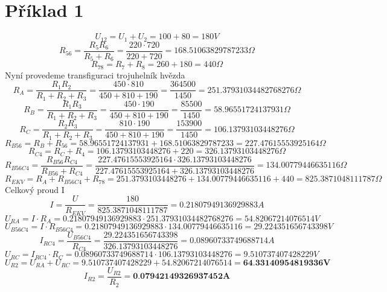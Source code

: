\section{Příklad 1}
\[
  U_{12} = U_{1} + U_{2} = 100 + 80 = 180V
\]
\[
  R_{56} = \displaystyle\frac{R_{5}R_{6}}{R_{5}+R_{6}}  = \displaystyle\frac{220 \cdot 720}{220 + 720} = 168.51063829787233 \Omega
\]
\[
  R_{78} = R_{7} + R_{8} = 260 + 180 = 440\Omega
\]
Nyní provedeme transfiguraci  trojuhelník hvězda
\[
  R_{A} = \displaystyle\frac{R_{1}R_{2}}{R_{1}+R_{2}+R_{3}}
  = \displaystyle\frac{450 \cdot 810}{450 + 810 + 190}
  = \displaystyle\frac{364500}{1450}
  = 251.37931034482768276 \Omega
\]
\[
  R_{B} = \displaystyle\frac{R_{1}R_{3}}{R_{1}+R_{2}+R_{3}}
  = \displaystyle\frac{450 \cdot 190}{450 + 810 + 190}
  = \displaystyle\frac{85500}{1450}
  = 58.96551724137931 \Omega
\]
\[
  R_{C} = \displaystyle\frac{R_{2}R_{3}}{R_{1}+R_{2}+R_{3}}
  = \displaystyle\frac{810 \cdot 190}{450 + 810 + 190}
  = \displaystyle\frac{153900}{1450}
  = 106.13793103448276 \Omega
\]
\[
  R_{B56} = R_{B} + R_{56} = 58.96551724137931 + 168.51063829787233 = 227.47615553925164 \Omega
\]
\[
  R_{C4} = R_{C} + R_{4} = 106.13793103448276 + 220 = 326.13793103448276 \Omega
\]
\[
  R_{B56C4} = \displaystyle\frac{R_{B56}R_{C4}}{R_{B56}+R_{C4}}
  = \displaystyle\frac{227.47615553925164 \cdot  326.13793103448276}{227.47615553925164 + 326.13793103448276}
  = 134.00779446635116 \Omega
\]
\[
  R_{EKV} = R_{A} + R_{B56C4} + R_{78} = 251.3793103448276 + 134.00779446635116 + 440
  = 825.3871048111787 \Omega
\]
Celkový proud I
\[
  I = \displaystyle\frac{U}{R_{EKV}} = \displaystyle\frac{180}{825.3871048111787} = 0.21807949136929883A
\]
\[
  U_{RA} = I \cdot R_A
  = 0.21807949136929883 \cdot 251.37931034482768276
  = 54.82067214076514V
\]
\[
  U_{B56C4} = I \cdot R_{B56C4}
 = 0.21807949136929883 \cdot 134.00779446635116
 = 29.224351656743398V
\]
\[
  I_{RC4} = \displaystyle\frac{U_{B56C4}}{R_{C4}} 
 = \displaystyle\frac{29.224351656743398}{326.13793103448276}
 = 0.08960733749688714 A
\] 
\[
  U_{RC} = I_{RC4} \cdot R_C
  = 0.08960733749688714  \cdot 106.13793103448276
  = 9.510737407428229 V
\]
\[
  U_{R2} = U_{RA} + U_{RC}
  = 9.510737407428229+54.82067214076514
  = \textbf{64.33140954819336V}
\]
\[
  I_{R2} = \displaystyle\frac{U_{R2}}{R_2}
  = \textbf{0.07942149326937452A}
\]


